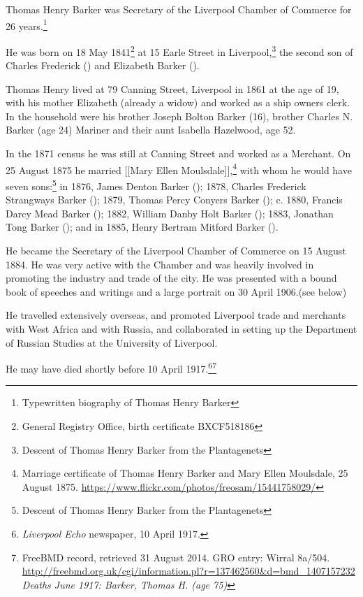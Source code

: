 
Thomas Henry Barker was Secretary of the Liverpool Chamber of Commerce for 26 years.\footnote{Typewritten biography of Thomas Henry Barker}

He was born on 18 May 1841\footnote{General Registry Office, birth certificate BXCF518186} at 15 Earle Street in Liverpool,\footnote{Descent of Thomas Henry Barker from the Plantagenets} the second son of Charles Frederick () and Elizabeth Barker ().

Thomas Henry lived at 79 Canning Street, Liverpool in 1861 at the age of 19, with his mother Elizabeth (already a widow) and worked as a ship owners clerk.  In the household were his brother Joseph Bolton Barker (16), brother Charles N. Barker (age 24) Mariner and their aunt Isabella Hazelwood, age 52.

In the 1871 census he was still at Canning Street and worked as a Merchant. On 25 August 1875 he married [[Mary Ellen Moulsdale]],\footnote{Marriage certificate of Thomas Henry Barker and Mary Ellen Moulsdale, 25 August 1875. \url{https://www.flickr.com/photos/freosam/15441758029/}} with whom he would have seven sons:\footnote{Descent of Thomas Henry Barker from the Plantagenets}
in 1876, James Denton Barker ();
1878, Charles Frederick Strangways Barker ();
1879, Thomas Percy Conyers Barker ();
c. 1880, Francis Darcy Mead Barker ();
1882, William Danby Holt Barker ();
1883, Jonathan Tong Barker (); and in
1885, Henry Bertram Mitford Barker ().

He became the Secretary of the Liverpool Chamber of Commerce on 15 August 1884.  He was very active with the Chamber and was heavily involved in promoting the industry and trade of the city.  He was presented with a bound book of speeches and writings and a large portrait on 30 April 1906.(see below)

He travelled extensively overseas, and promoted Liverpool trade and merchants with West Africa and with Russia, and collaborated in setting up the Department of Russian Studies at the University of Liverpool.

He may have died shortly before 10 April 1917.\footnote{\emph{Liverpool Echo} newspaper, 10 April 1917.}\footnote{FreeBMD record, retrieved 31 August 2014. GRO entry: Wirral 8a/504. \url{http://freebmd.org.uk/cgi/information.pl?r=137462560&d=bmd_1407157232} \emph{Deaths June 1917: Barker, Thomas H. (age 75)}}

